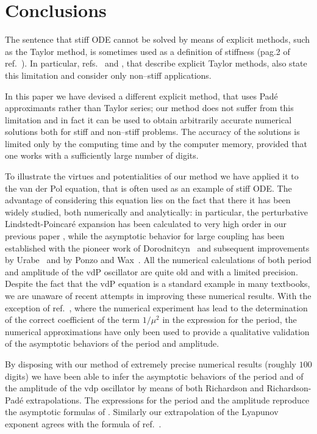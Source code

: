 \documentclass[final]{article}
\begin{document}
\section{Conclusions}
\label{sec:concl}

The sentence that stiff ODE cannot be solved by means of explicit methods, such as the Taylor method, is sometimes used as a definition
of stiffness (pag.2 of ref.~\cite{Wanner96}). In particular, refs.~\cite{Jorba05} and \cite{Barrio05}, that describe  explicit Taylor methods, also state this limitation and consider only non--stiff applications.

In this paper we have devised a different explicit method, that uses Pad\'e approximants rather than Taylor series; our method does not suffer from this limitation and in fact it can be used to obtain arbitrarily accurate numerical solutions both  for stiff and 
non--stiff problems. The accuracy of the solutions is limited only by the computing time and by the computer memory, provided that one works with a sufficiently large number of digits. 

To illustrate the virtues and potentialities of our method we have applied it to the van der Pol equation, that is often used as an 
example of stiff ODE. The advantage of considering this equation lies on the fact that there it has been widely studied, both numerically and analytically: in particular, the perturbative Lindstedt-Poincar\'e expansion has been calculated to very high order in our previous paper \cite{Amore18}, while the asymptotic behavior for large coupling has been established with the pioneer work of 
Dorodnitcyn~\cite{Dor47,Dor52} and subsequent improvements by Urabe~\cite{Urabe60} and by Ponzo and Wax~\cite{Ponzo65b}. All the numerical calculations of both period and amplitude of the vdP oscillator are quite old and with a  limited precision. Despite the fact
that the vdP equation is a standard example in many textbooks, we are unaware of recent attempts in improving these numerical results.
With the exception of ref.~\cite{Ponzo65b}, where the numerical experiment has lead to the determination of the correct coefficient
of the term $1/\mu^2$ in the expression for the period, the numerical approximations have only been used to provide a qualitative
validation of the asymptotic behaviors of the period and amplitude.

By disposing with our method of extremely precise numerical results (roughly $100$ digits) we have been able to infer the asymptotic
behaviors of the period and of the amplitude of the vdp oscillator by means of both Richardson and Richardson-Pad\'e extrapolations.
The expressions for the period and the amplitude reproduce the asymptotic formulas of \cite{Dor47,Dor52,Urabe60,Ponzo65b}. 
Similarly our extrapolation of the Lyapunov exponent agrees with the formula of ref.~\cite{Grasman05}.
\end{document}
